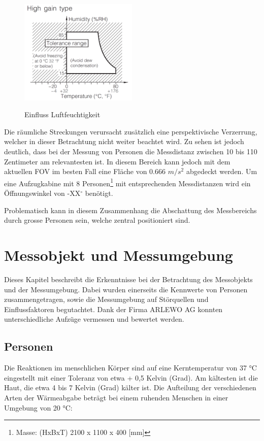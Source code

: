 \begin{figure}[H]
	\centering
	\includegraphics[width=0.5\textwidth]
	{fig/Humidity_Tolerance.PNG}
	\caption[Einfluss Luftfeuchtigkeit]{Einfluss Luftfeuchtigkeit} \protect\cite{AMG8834}
	\label{fig:Geometrie}
\end{figure}

Die räumliche Streckungen verursacht zusätzlich eine perspektivische Verzerrung, welcher in dieser Betrachtung nicht weiter beachtet wird. Zu sehen ist jedoch deutlich, dass bei der Messung von Personen die Messdistanz zwischen 10 bis 110 Zentimeter am relevantesten ist. In diesem Bereich kann jedoch mit dem aktuellen \ac{FOV} im besten Fall eine Fläche von 0.666 $ m/s^2 $ abgedeckt werden. Um eine Aufzugkabine mit 8 Personen\footnote[1]{Masse: (HxBxT) 2100 x 1100 x 400 [mm]} mit entsprechenden Messdistanzen wird ein Öffnungswinkel von -XX$^\circ$ benötigt. 

Problematisch kann in diesem Zusammenhang die Abschattung des Messbereichs durch grosse Personen sein, welche zentral positioniert sind. 

 

\section{Messobjekt und Messumgebung}

Dieses Kapitel beschreibt die Erkenntnisse bei der Betrachtung des Messobjekts und der Messumgebung. Dabei wurden einerseits die Kennwerte von Personen zusammengetragen, sowie die Messumgebung auf Störquellen und Einflussfaktoren begutachtet. Dank der Firma ARLEWO AG konnten unterschiedliche Aufzüge vermessen und bewertet werden. 

\subsection{Personen}

Die Reaktionen im menschlichen Körper sind auf eine Kerntemperatur von 37 °C eingestellt mit einer Toleranz von etwa + 0,5 Kelvin (Grad). Am kältesten ist die Haut, die etwa 4 bis 7 Kelvin (Grad) kälter ist. Die Aufteilung der verschiedenen Arten der Wärmeabgabe beträgt bei einem ruhenden Menschen in einer Umgebung von 20 °C:

